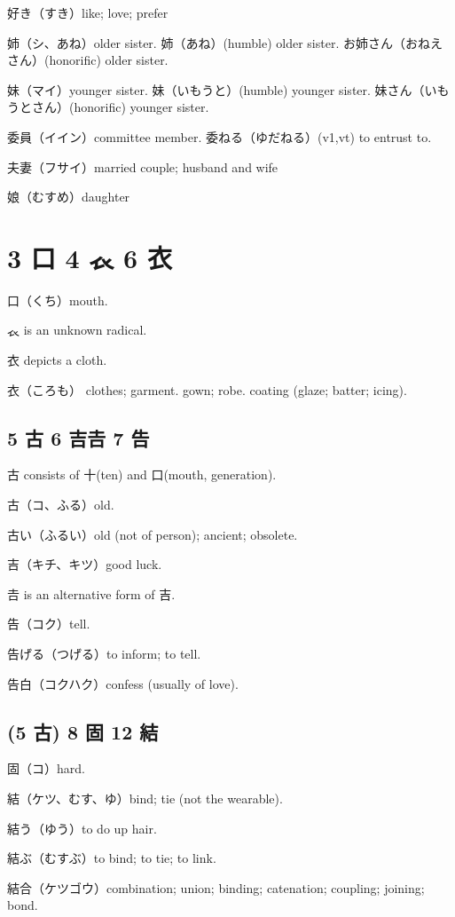 好き（すき）like; love; prefer

姉（シ、あね）older sister.
姉（あね）(humble) older sister.
お姉さん（おねえさん）(honorific) older sister.

妹（マイ）younger sister.
妹（いもうと）(humble) younger sister.
妹さん（いもうとさん）(honorific) younger sister.

委員（イイン）committee member.
委ねる（ゆだねる）(v1,vt) to entrust to.

夫妻（フサイ）married couple; husband and wife

娘（むすめ）daughter

\section{3 口 4 𧘇 6 衣}

口（くち）mouth.

𧘇 is an unknown radical.

衣 depicts a cloth.

衣（ころも）
clothes;
garment. gown;
robe. coating (glaze; batter; icing).

\subsection{5 古 6 吉𠮷 7 告}

古 consists of 十(ten) and 口(mouth, generation).

古（コ、ふる）old.

古い（ふるい）old (not of person); ancient; obsolete.

吉（キチ、キツ）good luck.

𠮷 is an alternative form of 吉.

告（コク）tell.

告げる（つげる）to inform; to tell.

告白（コクハク）confess (usually of love).

\subsection{(5 古) 8 固 12 結}

固（コ）hard.

結（ケツ、むす、ゆ）bind; tie (not the wearable).

結う（ゆう）to do up hair.

結ぶ（むすぶ）to bind; to tie; to link.

結合（ケツゴウ）combination; union; binding; catenation; coupling; joining; bond.

